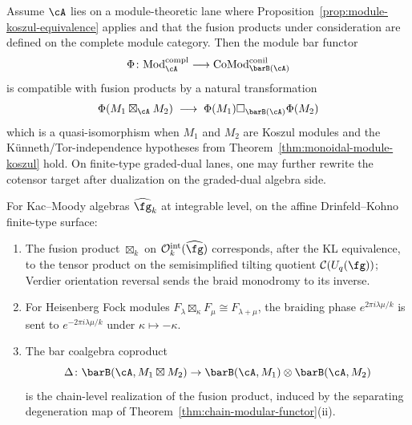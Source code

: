 \begin{theorem}\label{thm:fusion-bar-cobar}
Assume $\cA$ lies on a module-theoretic lane where
Proposition~\ref{prop:module-koszul-equivalence} applies and that the
fusion products under consideration are defined on the complete module
category. Then the module bar functor
\[
\Phi\colon
\mathrm{Mod}^{\mathrm{compl}}_{\cA}
\longrightarrow
\mathrm{CoMod}^{\mathrm{conil}}_{\barB(\cA)}
\]
is compatible with fusion products by a natural transformation
\begin{equation}\label{eq:fusion-preservation}
\Phi(M_1 \boxtimes_\cA M_2)
\;\longrightarrow\;
\Phi(M_1) \square_{\barB(\cA)} \Phi(M_2)
\end{equation}
which is a quasi-isomorphism when $M_1$ and $M_2$ are Koszul modules
and the K\"unneth/Tor-independence hypotheses from
Theorem~\ref{thm:monoidal-module-koszul} hold. On finite-type
graded-dual lanes, one may further rewrite the cotensor target after
dualization on the graded-dual algebra side.

For Kac--Moody algebras $\widehat{\fg}_k$ at integrable level, on
the affine Drinfeld--Kohno finite-type surface:
\begin{enumerate}[label=\textup{(\roman*)}]
\item The fusion product $\boxtimes_k$ on
 $\mathcal{O}_k^{\mathrm{int}}(\widehat{\fg})$ corresponds, after
 the KL equivalence, to the tensor product on the semisimplified
 tilting quotient $\mathcal{C}(U_q(\fg))$; Verdier orientation
 reversal sends the braid monodromy to its inverse.
\item For Heisenberg Fock modules $F_\lambda \boxtimes_\kappa
 F_\mu \cong F_{\lambda+\mu}$, the braiding phase
 $e^{2\pi i \lambda\mu/k}$ is sent to
 $e^{-2\pi i \lambda\mu/k}$ under $\kappa \mapsto -\kappa$.
\item The bar coalgebra coproduct
 \begin{equation}\label{eq:bar-coproduct-fusion}
 \Delta\colon \barB(\cA, M_1 \boxtimes M_2) \to
 \barB(\cA, M_1) \otimes \barB(\cA, M_2)
 \end{equation}
 is the chain-level realization of the fusion product, induced by
 the separating degeneration map of
 Theorem~\textup{\ref{thm:chain-modular-functor}(ii)}.
\end{enumerate}
\end{theorem}

